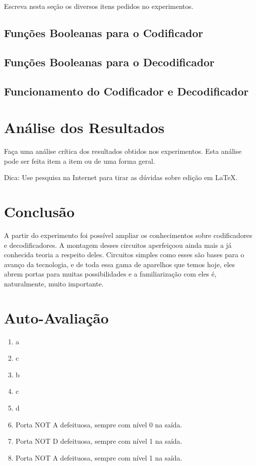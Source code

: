 \documentclass[12pt]{article}
\begin{document}
Escreva nesta seção os diversos itens pedidos no experimentos. 

\subsection{Funções Booleanas para o Codificador}
\label{sec:Cod}


\subsection{Funções Booleanas para o Decodificador}
\label{sec:Decod}

\subsection{Funcionamento do Codificador e Decodificador}



\section{Análise dos Resultados}
\label{sec:Resultados}

Faça uma análise crítica dos resultados obtidos nos experimentos. Esta análise pode ser feita item a item ou de uma forma geral.

Dica: Use pesquisa na Internet para tirar as dúvidas sobre edição em \LaTeX .

\section{Conclusão}
\label{sec:Conclusao}

A partir do experimento foi possível ampliar os conhecimentos sobre codificadores e decodificadores. A montagem desses circuitos aperfeiçoou ainda mais a já conhecida teoria a respeito deles. Circuitos simples como esses são bases para o avanço da tecnologia, e de toda essa gama de aparelhos que temos hoje, eles abrem portas para muitas possibilidades e a familiarização com eles é, naturalmente, muito importante.






\newpage 
\section*{Auto-Avaliação}

\begin{enumerate}
    \item a
    \item c
    \item b
    \item c
    \item d
    \item Porta NOT A defeituosa, sempre com nível 0 na saída.
    \item Porta NOT D defeituosa, sempre com nível 1 na saída. 
    \item Porta NOT A defeituosa, sempre com nível 1 na saída.
\end{enumerate}
\end{document}
